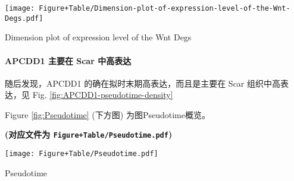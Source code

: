 \documentclass[
]{article}
\newenvironment{Shaded}{\begin{snugshade}}{\end{snugshade}}
\newcommand{\DataTypeTok}[1]{\textcolor[rgb]{0.13,0.29,0.53}{#1}}
\newcommand{\KeywordTok}[1]{\textcolor[rgb]{0.13,0.29,0.53}{\textbf{#1}}}
\newcommand{\NormalTok}[1]{#1}
\newcommand{\OperatorTok}[1]{\textcolor[rgb]{0.81,0.36,0.00}{\textbf{#1}}}
\newcommand{\StringTok}[1]{\textcolor[rgb]{0.31,0.60,0.02}{#1}}
\begin{document}
\def\@captype{figure}
\begin{center}
\texttt{[image: Figure+Table/Dimension-plot-of-expression-level-of-the-Wnt-Degs.pdf]}
\caption{Dimension plot of expression level of the Wnt Degs}\label{fig:Dimension-plot-of-expression-level-of-the-Wnt-Degs}
\end{center}

\hypertarget{apcdd1-ux4e3bux8981ux5728-scar-ux4e2dux9ad8ux8868ux8fbe}{%
\paragraph{APCDD1 主要在 Scar 中高表达}\label{apcdd1-ux4e3bux8981ux5728-scar-ux4e2dux9ad8ux8868ux8fbe}}

随后发现，APCDD1 的确在拟时末期高表达，而且是主要在 Scar 组织中高表达，见
Fig. \ref{fig:APCDD1-pseudotime-density}

\begin{Shaded}
\end{Shaded}

Figure \ref{fig:Pseudotime} (下方图) 为图Pseudotime概览。

\textbf{(对应文件为 \texttt{Figure+Table/Pseudotime.pdf})}

\def\@captype{figure}
\begin{center}
\texttt{[image: Figure+Table/Pseudotime.pdf]}
\caption{Pseudotime}\label{fig:Pseudotime}
\end{center}
\end{document}

